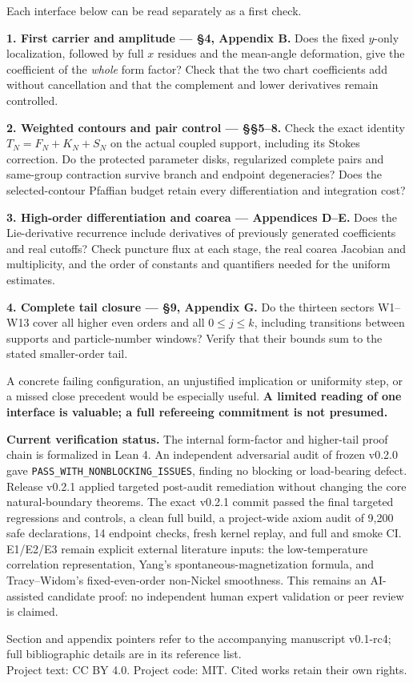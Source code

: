 \documentclass[11pt,a4paper]{article}
\newcommand{\heading}[1]{\par\vspace{5pt}{\large\bfseries #1}\par\vspace{1pt}}
\begin{document}
\heading{Suggested independent reading}
Each interface below can be read separately as a first check.

\textbf{1. First carrier and amplitude --- \S4, Appendix B.}
Does the fixed \(y\)-only localization, followed by full \(x\) residues
and the mean-angle deformation, give the coefficient of the \emph{whole}
form factor? Check that the two chart coefficients add without cancellation
and that the complement and lower derivatives remain controlled.

\textbf{2. Weighted contours and pair control --- \S\S5--8.}
Check the exact identity \(T_N=F_N+K_N+S_N\) on the actual coupled
support, including its Stokes correction. Do the protected parameter disks,
regularized complete pairs and same-group contraction survive branch and
endpoint degeneracies? Does the selected-contour Pfaffian budget retain
every differentiation and integration cost?

\textbf{3. High-order differentiation and coarea --- Appendices D--E.}
Does the Lie-derivative recurrence include derivatives of previously
generated coefficients and real cutoffs? Check puncture flux at each stage,
the real coarea Jacobian and multiplicity, and the order of constants and
quantifiers needed for the uniform estimates.

\textbf{4. Complete tail closure --- \S9, Appendix G.}
Do the thirteen sectors W1--W13 cover all higher even orders and all
\(0\le j\le k\), including transitions between supports and particle-number
windows? Verify that their bounds sum to the stated smaller-order tail.

\heading{Specific feedback sought}
A concrete failing configuration, an unjustified implication or uniformity
step, or a missed close precedent would be especially useful.
\textbf{A limited reading of one interface is valuable; a full refereeing
commitment is not presumed.}

\textbf{Current verification status.} The internal form-factor and higher-tail proof chain is
formalized in Lean 4. An independent adversarial audit of frozen v0.2.0 gave
\texttt{PASS\_WITH\_NONBLOCKING\_ISSUES}, finding no blocking or load-bearing defect.
Release v0.2.1 applied targeted post-audit remediation without changing the core
natural-boundary theorems. The exact v0.2.1 commit passed the final targeted
regressions and controls, a clean full build, a project-wide axiom audit of 9,200
safe declarations, 14 endpoint checks, fresh kernel replay, and full and smoke CI.
E1/E2/E3 remain explicit external literature inputs: the low-temperature correlation
representation, Yang's spontaneous-magnetization formula, and Tracy--Widom's
fixed-even-order non-Nickel smoothness. This remains an AI-assisted candidate
proof: no independent human expert validation or peer review is claimed.

\vfill
{\small Section and appendix pointers refer to the accompanying
manuscript v0.1-rc4; full bibliographic details are in its reference list.\\
Project text: CC BY 4.0. Project code: MIT. Cited works retain their own rights.}
\end{document}
